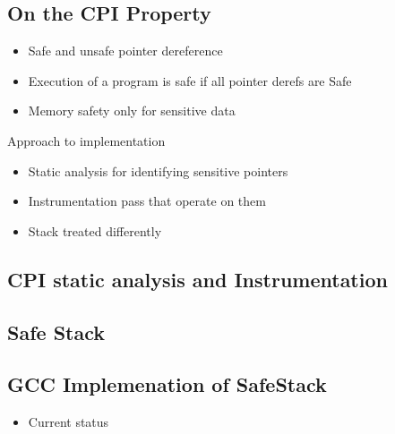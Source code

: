 
\subsection {On the CPI Property}
\begin {itemize}
  \item Safe and unsafe pointer dereference
  \item Execution of a program is safe if all pointer derefs are Safe
  \item Memory safety only for sensitive data
\end {itemize}
Approach to implementation
\begin {itemize}
  \item Static analysis for identifying sensitive pointers
  \item Instrumentation pass that operate on them
  \item Stack treated differently
\end {itemize}

\subsection {CPI static analysis and Instrumentation}

\subsection {Safe Stack}

\subsection {GCC Implemenation of SafeStack}

\begin {itemize}
  \item Current status
\end {itemize}


